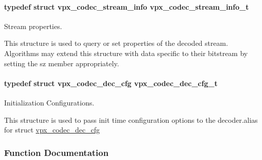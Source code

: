 \paragraph[{\texorpdfstring{vpx\+\_\+codec\+\_\+stream\+\_\+info\+\_\+t}{vpx_codec_stream_info_t}}]{\setlength{\rightskip}{0pt plus 5cm}typedef struct {\bf vpx\+\_\+codec\+\_\+stream\+\_\+info}  {\bf vpx\+\_\+codec\+\_\+stream\+\_\+info\+\_\+t}}\hypertarget{group__decoder_ga900420e8f7cb9c1b3070b2ba7d636974}{}\label{group__decoder_ga900420e8f7cb9c1b3070b2ba7d636974}


Stream properties. 

This structure is used to query or set properties of the decoded stream. Algorithms may extend this structure with data specific to their bitstream by setting the sz member appropriately. 
\paragraph[{\texorpdfstring{vpx\+\_\+codec\+\_\+dec\+\_\+cfg\+\_\+t}{vpx_codec_dec_cfg_t}}]{\setlength{\rightskip}{0pt plus 5cm}typedef struct {\bf vpx\+\_\+codec\+\_\+dec\+\_\+cfg}  {\bf vpx\+\_\+codec\+\_\+dec\+\_\+cfg\+\_\+t}}\hypertarget{group__decoder_ga4a2e808eb43f1e798024b5a409c484f9}{}\label{group__decoder_ga4a2e808eb43f1e798024b5a409c484f9}


Initialization Configurations. 

This structure is used to pass init time configuration options to the decoder.\+alias for struct \hyperlink{structvpx__codec__dec__cfg}{vpx\+\_\+codec\+\_\+dec\+\_\+cfg} 

\subsubsection{Function Documentation}

